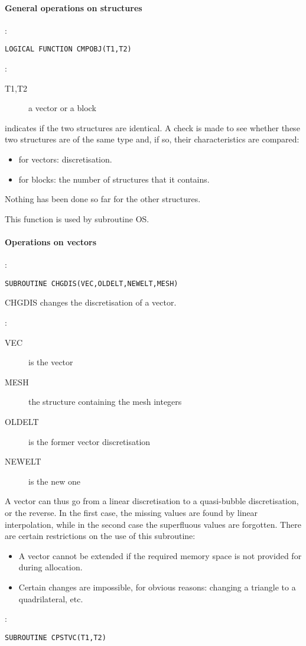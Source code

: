 \paragraph{General operations on structures}

:
\begin{lstlisting}[language=TelFortran]
LOGICAL FUNCTION CMPOBJ(T1,T2)
\end{lstlisting}

:
\begin{description}
  \item [T1,T2]a vector or a block
\end{description}

 indicates if the two structures are identical. A check is made to see
whether these two structures are of the same type and, if so, their
characteristics are compared:
\begin{itemize}
  \item for vectors: discretisation.
  \item for blocks: the number of structures that it contains.
\end{itemize}

Nothing has been done so far for the other structures.

This function is used by subroutine OS.

\paragraph{Operations on vectors}

:
\begin{lstlisting}[language=TelFortran]
SUBROUTINE CHGDIS(VEC,OLDELT,NEWELT,MESH)
\end{lstlisting}

CHGDIS changes the discretisation of a vector.

:
\begin{description}
  \item [VEC] is the vector
  \item [MESH] the structure containing the mesh integers
  \item [OLDELT] is the former vector discretisation
  \item [NEWELT] is the new one
\end{description}
A vector can thus go from a linear discretisation to a quasi-bubble
discretisation, or the reverse. In the first case, the missing values are found
by linear interpolation, while in the second case the superfluous values are
forgotten. There are certain restrictions on the use of this subroutine:
\begin{itemize}
  \item A vector cannot be extended if the required memory space is not
    provided for during allocation.
  \item Certain changes are impossible, for obvious reasons: changing a
    triangle to a quadrilateral, etc.
\end{itemize}
:
\begin{lstlisting}[language=TelFortran]
SUBROUTINE CPSTVC(T1,T2)
\end{lstlisting}

